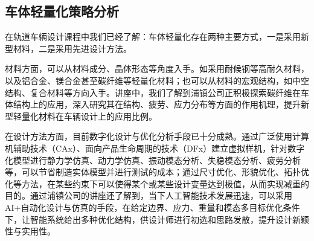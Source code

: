 \subsection{车体轻量化策略分析}
在轨道车辆设计课程中我们已经了解：车体轻量化存在两种主要方式，一是采用新型材料，二是采用先进设计方法。\par{}
材料方面，可以从材料成分、晶体形态等角度入手。如采用耐候钢等高耐久材料，以及铝合金、镁合金甚至碳纤维等轻量化材料；也可以从材料的宏观结构，如中空结构、复合材料等方向入手。讲座中，我们了解到浦镇公司正积极探索碳纤维在车体结构上的应用，深入研究其在结构、疲劳、应力分布等方面的作用机理，提升新型轻量化材料在车辆设计上的应用比例。\par{}
在设计方法方面，目前数字化设计与优化分析手段已十分成熟。通过广泛使用计算机辅助技术（CAx）、面向产品生命周期的技术（DFx）建立虚拟样机，针对数字化模型进行静力学仿真、动力学仿真、振动模态分析、失稳模态分析、疲劳分析等，可以节省制造实体模型并进行测试的成本；通过尺寸优化、形貌优化、拓扑优化等方法，在某些约束下可以使得某个或某些设计变量达到极值，从而实现减重的目的。通过浦镇公司的讲座还了解到，当下人工智能技术发展迅速，可以采用AI+自动化设计与仿真的手段，在给定边界、应力、重量和模态多目标优化条件下，让智能系统给出多种优化结构，供设计师进行初选和思路发散，提升设计新颖性与实用性。\par{}

